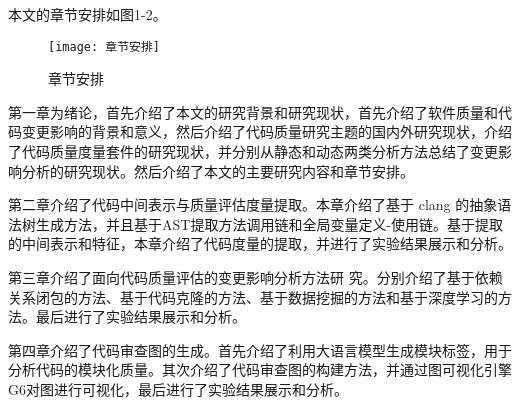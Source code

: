 本文的章节安排如图1-2。

\begin{figure}[h]
\centering
\texttt{[image: 章节安排]}
\caption{章节安排}
\end{figure}

第一章为绪论，首先介绍了本文的研究背景和研究现状，首先介绍了软件质量和代码变更影响的背景和意义，然后介绍了代码质量研究主题的国内外研究现状，介绍了代码质量度量套件的研究现状，并分别从静态和动态两类分析方法总结了变更影响分析的研究现状。然后介绍了本文的主要研究内容和章节安排。

第二章介绍了代码中间表示与质量评估度量提取。本章介绍了基于 clang 的抽象语法树生成方法，并且基于AST提取方法调用链和全局变量定义-使用链。基于提取的中间表示和特征，本章介绍了代码度量的提取，并进行了实验结果展示和分析。

第三章介绍了面向代码质量评估的变更影响分析方法研
究。分别介绍了基于依赖关系闭包的方法、基于代码克隆的方法、基于数据挖掘的方法和基于深度学习的方法。最后进行了实验结果展示和分析。

第四章介绍了代码审查图的生成。首先介绍了利用大语言模型生成模块标签，用于分析代码的模块化质量。其次介绍了代码审查图的构建方法，并通过图可视化引擎G6对图进行可视化，最后进行了实验结果展示和分析。



